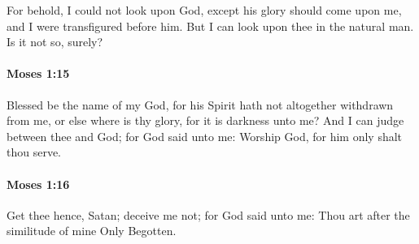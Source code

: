 			For behold, I could not look upon God, except his glory should come upon me, and I were transfigured before him. But I can look upon thee in the natural man. Is it not so, surely?


		\paragraph{Moses 1:15} %
			\label{MOSES-1-15}

			Blessed be the name of my God, for his Spirit hath not altogether withdrawn from me, or else where is thy glory, for it is darkness unto me? And I can judge between thee and God; for God said unto me: Worship God, for him only shalt thou serve.


		\paragraph{Moses 1:16} %
			\label{MOSES-1-16}

			Get thee hence, Satan; deceive me not; for God said unto me: Thou art after the similitude of mine Only Begotten.


